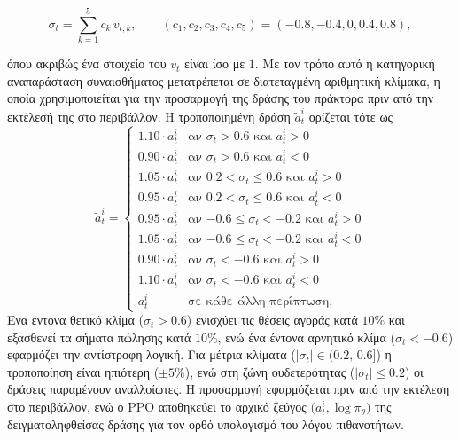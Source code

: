 \begin{equation}
  \sigma_t =
  \sum_{k=1}^{5} c_k\,v_{t,k},
  \qquad
  (c_1,c_2,c_3,c_4,c_5)
  =
  (-0.8,-0.4,0,0.4,0.8),
  \label{eq:sigma-t}
\end{equation}

όπου ακριβώς ένα στοιχείο του $v_t$ είναι ίσο με $1$. Με τον τρόπο αυτό
η κατηγορική αναπαράσταση συναισθήματος μετατρέπεται σε διατεταγμένη αριθμητική 
κλίμακα, η οποία χρησιμοποιείται για την προσαρμογή της δράσης του
πράκτορα πριν από την εκτέλεσή της στο περιβάλλον.
Η τροποποιημένη δράση $\tilde{a}^{i}_t$ ορίζεται τότε ως
\begin{equation}
\tilde{a}^{i}_t =
\begin{cases}
  1{.}10 \cdot a^{i}_t
    & \text{αν } \sigma_t > 0{.}6 \text{ και } a^{i}_t > 0 \\[3pt]
  0{.}90 \cdot a^{i}_t
    & \text{αν } \sigma_t > 0{.}6 \text{ και } a^{i}_t < 0 \\[3pt]
  1{.}05 \cdot a^{i}_t
    & \text{αν } 0{.}2 < \sigma_t \leq 0{.}6 \text{ και } a^{i}_t > 0 \\[3pt]
  0{.}95 \cdot a^{i}_t
    & \text{αν } 0{.}2 < \sigma_t \leq 0{.}6 \text{ και } a^{i}_t < 0 \\[3pt]
  0{.}95 \cdot a^{i}_t
    & \text{αν } {-0{.}6} \leq \sigma_t < {-0{.}2} \text{ και } a^{i}_t > 0 \\[3pt]
  1{.}05 \cdot a^{i}_t
    & \text{αν } {-0{.}6} \leq \sigma_t < {-0{.}2} \text{ και } a^{i}_t < 0 \\[3pt]
  0{.}90 \cdot a^{i}_t
    & \text{αν } \sigma_t < {-0{.}6} \text{ και } a^{i}_t > 0 \\[3pt]
  1{.}10 \cdot a^{i}_t
    & \text{αν } \sigma_t < {-0{.}6} \text{ και } a^{i}_t < 0 \\[3pt]
  a^{i}_t
    & \text{σε κάθε άλλη περίπτωση,}
\end{cases}
\label{eq:actionmod}
\end{equation}
Ένα έντονα θετικό κλίμα ($\sigma_t > 0{.}6$) ενισχύει τις θέσεις αγοράς κατά $10\%$ και
εξασθενεί τα σήματα πώλησης κατά $10\%$, ενώ ένα έντονα αρνητικό κλίμα
($\sigma_t < {-0{.}6}$) εφαρμόζει την αντίστροφη λογική. Για μέτρια κλίματα
($|\sigma_t| \in (0{.}2,\, 0{.}6]$) η τροποποίηση είναι ηπιότερη ($\pm 5\%$),
ενώ στη ζώνη ουδετερότητας ($|\sigma_t| \leq 0{.}2$) οι δράσεις παραμένουν
αναλλοίωτες. Η προσαρμογή εφαρμόζεται πριν από την εκτέλεση στο περιβάλλον,
ενώ ο PPO αποθηκεύει το αρχικό ζεύγος $\bigl(a^{i}_t, \log \pi_\theta\bigr)$
της δειγματοληφθείσας δράσης για τον ορθό υπολογισμό του λόγου πιθανοτήτων.


